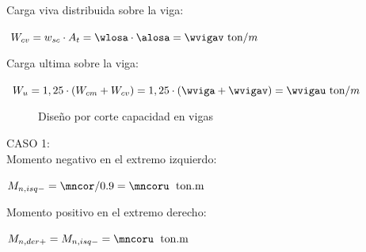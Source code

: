 \noindent Carga viva distribuida  sobre la viga:
\begin{center}
$W_{c v}=w_{sc} \cdot A_{t}=\wlosa\cdot\alosa=\wvigav \text {~ton}/{m}$
\end{center}
\noindent Carga ultima sobre la viga:
\begin{center}
$W_{u}=1,25 \cdot\left(W_{c m}+W_{c v}\right)=1,25 \cdot\left(\wviga+\wvigav\right)=\wvigau \text {~ton}/{m}$
\end{center}
\begin{figure}[h!]
    \centering
    \hspace{0mm}
    \caption{Diseño por corte capacidad en vigas}
    \label{reqv}
\end{figure}
\newpage
\noindent CASO 1:\\
Momento negativo en el extremo izquierdo:
\begin{center}
$M_{n,isq-}=\mncor/0.9=\mncoru\;\mathrm{~ton.m}$
\end{center}
Momento positivo en el extremo derecho:
\begin{center}
$M_{n,der+}=M_{n,isq-}=\mncoru\;\mathrm{~ton.m}$
\end{center}
